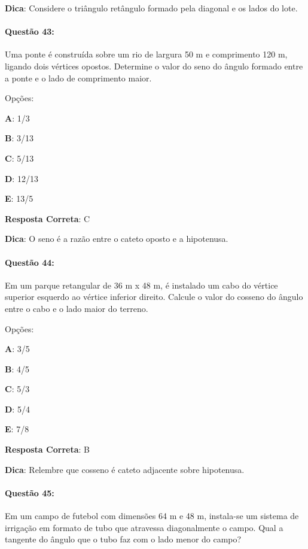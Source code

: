\documentclass{article}
\begin{document}
\vspace{\baselineskip}\textbf{Dica}: Considere o triângulo retângulo formado pela diagonal e os lados do lote.

\paragraph{Questão 43:}
{Uma ponte é construída sobre um rio de largura 50 m e comprimento 120 m, ligando dois vértices opostos. Determine o valor do seno do ângulo formado entre a ponte e o lado de comprimento maior.}

\vspace{\baselineskip}Opções:

\vspace{\baselineskip}\textbf{A}: 1/3 

\textbf{B}: 3/13 

\textbf{C}: 5/13 

\textbf{D}: 12/13 

\textbf{E}: 13/5 

\vspace{\baselineskip}\textbf{Resposta Correta}: C

\vspace{\baselineskip}\textbf{Dica}: O seno é a razão entre o cateto oposto e a hipotenusa.

\paragraph{Questão 44:}
{Em um parque retangular de 36 m x 48 m, é instalado um cabo do vértice superior esquerdo ao vértice inferior direito. Calcule o valor do cosseno do ângulo entre o cabo e o lado maior do terreno.}

\vspace{\baselineskip}Opções:

\vspace{\baselineskip}\textbf{A}: 3/5 

\textbf{B}: 4/5 

\textbf{C}: 5/3 

\textbf{D}: 5/4 

\textbf{E}: 7/8 

\vspace{\baselineskip}\textbf{Resposta Correta}: B

\vspace{\baselineskip}\textbf{Dica}: Relembre que cosseno é cateto adjacente sobre hipotenusa.

\paragraph{Questão 45:}
{Em um campo de futebol com dimensões 64 m e 48 m, instala-se um sistema de irrigação em formato de tubo que atravessa diagonalmente o campo. Qual a tangente do ângulo que o tubo faz com o lado menor do campo?}
\end{document}
